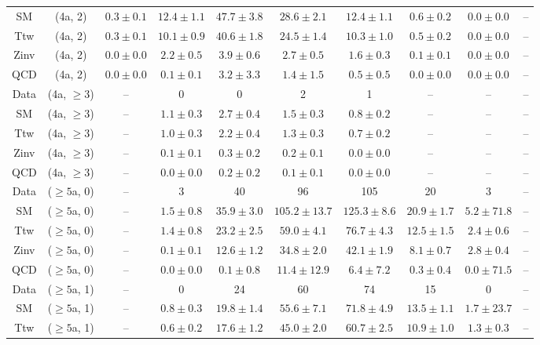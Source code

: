 \begin{table}[h!]
{\begin{tabular}{cccccccccc}
	SM & (4a, 2) & $0.3\pm 0.1$ & $12.4\pm 1.1$ & $47.7\pm 3.8$ & $28.6\pm 2.1$ & $12.4\pm 1.1$ & $0.6\pm 0.2$ & $0.0\pm 0.0$ & -- \\[0.5ex] 
	Ttw & (4a, 2) & $0.3\pm 0.1$ & $10.1\pm 0.9$ & $40.6\pm 1.8$ & $24.5\pm 1.4$ & $10.3\pm 1.0$ & $0.5\pm 0.2$ & $0.0\pm 0.0$ & -- \\[0.5ex] 
	Zinv & (4a, 2) & $0.0\pm 0.0$ & $2.2\pm 0.5$ & $3.9\pm 0.6$ & $2.7\pm 0.5$ & $1.6\pm 0.3$ & $0.1\pm 0.1$ & $0.0\pm 0.0$ & -- \\[0.5ex] 
	QCD & (4a, 2) & $0.0\pm 0.0$ & $0.1\pm 0.1$ & $3.2\pm 3.3$ & $1.4\pm 1.5$ & $0.5\pm 0.5$ & $0.0\pm 0.0$ & $0.0\pm 0.0$ & -- \\[0.5ex] 
	Data & (4a, $\ge3$) & -- & 0 & 0 & 2 & 1 & -- & -- & -- \\[0.5ex] 
	SM & (4a, $\ge3$) & -- & $1.1\pm 0.3$ & $2.7\pm 0.4$ & $1.5\pm 0.3$ & $0.8\pm 0.2$ & -- & -- & -- \\[0.5ex] 
	Ttw & (4a, $\ge3$) & -- & $1.0\pm 0.3$ & $2.2\pm 0.4$ & $1.3\pm 0.3$ & $0.7\pm 0.2$ & -- & -- & -- \\[0.5ex] 
	Zinv & (4a, $\ge3$) & -- & $0.1\pm 0.1$ & $0.3\pm 0.2$ & $0.2\pm 0.1$ & $0.0\pm 0.0$ & -- & -- & -- \\[0.5ex] 
	QCD & (4a, $\ge3$) & -- & $0.0\pm 0.0$ & $0.2\pm 0.2$ & $0.1\pm 0.1$ & $0.0\pm 0.0$ & -- & -- & -- \\[0.5ex] 
	Data & ($\ge5$a, 0) & -- & 3 & 40 & 96 & 105 & 20 & 3 & -- \\[0.5ex] 
	SM & ($\ge5$a, 0) & -- & $1.5\pm 0.8$ & $35.9\pm 3.0$ & $105.2\pm 13.7$ & $125.3\pm 8.6$ & $20.9\pm 1.7$ & $5.2\pm 71.8$ & -- \\[0.5ex] 
	Ttw & ($\ge5$a, 0) & -- & $1.4\pm 0.8$ & $23.2\pm 2.5$ & $59.0\pm 4.1$ & $76.7\pm 4.3$ & $12.5\pm 1.5$ & $2.4\pm 0.6$ & -- \\[0.5ex] 
	Zinv & ($\ge5$a, 0) & -- & $0.1\pm 0.1$ & $12.6\pm 1.2$ & $34.8\pm 2.0$ & $42.1\pm 1.9$ & $8.1\pm 0.7$ & $2.8\pm 0.4$ & -- \\[0.5ex] 
	QCD & ($\ge5$a, 0) & -- & $0.0\pm 0.0$ & $0.1\pm 0.8$ & $11.4\pm 12.9$ & $6.4\pm 7.2$ & $0.3\pm 0.4$ & $0.0\pm 71.5$ & -- \\[0.5ex] 
	Data & ($\ge5$a, 1) & -- & 0 & 24 & 60 & 74 & 15 & 0 & -- \\[0.5ex] 
	SM & ($\ge5$a, 1) & -- & $0.8\pm 0.3$ & $19.8\pm 1.4$ & $55.6\pm 7.1$ & $71.8\pm 4.9$ & $13.5\pm 1.1$ & $1.7\pm 23.7$ & -- \\[0.5ex] 
	Ttw & ($\ge5$a, 1) & -- & $0.6\pm 0.2$ & $17.6\pm 1.2$ & $45.0\pm 2.0$ & $60.7\pm 2.5$ & $10.9\pm 1.0$ & $1.3\pm 0.3$ & -- \\[0.5ex] 

\end{tabular}}
\end{table}
